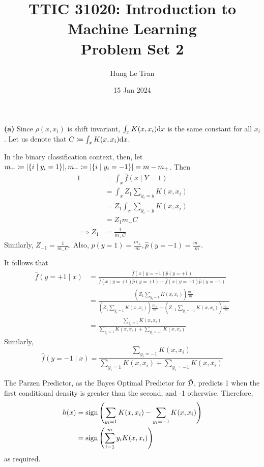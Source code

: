 \documentclass[a4paper, 12pt]{article}
\title{TTIC 31020: Introduction to Machine Learning \\ \large Problem Set 2}
\date{15 Jan 2024}
\author{Hung Le Tran}
\begin{document}
\maketitle
\setcounter{section}{2}
\begin{problem} [Problem 1]
\textbf{(a)} Since $\rho(x, x_i)$ is shift invariant, $\int_x K(x, x_i) \mathrm{d} x$ is the same constant for all $x_i$. Let us denote that $C \coloneqq \int_x K(x, x_i) \mathrm{d} x$.

In the binary classification context, then, let $m_+ \coloneqq \lvert\{i \mid y_i = 1\}\rvert, m_- \coloneqq  \lvert\{i \mid y_i = -1\}\rvert = m-m_+$. Then 
\begin{align*}
    1 &= \int_x \hat{f} (x \mid Y = 1) \\
    &= \int_x Z_{1} \sum_{y_i = y} {K(x, x_i)} \\
    &= Z_1 \int_x \sum_{y_i = y} {K(x, x_i)} \\
    &= Z_1 m_+ C \\
    \implies Z_1 &= \frac{1}{m_+ C}
\end{align*}
Similarly, $Z_{-1} = \frac{1}{m_-C}$.
Also, $\hat{p}(y = 1) = \frac{m_+}{m}, \hat{p} (y = -1) = \frac{m_-}{m}$.

It follows that \begin{align*}
    \hat{f}(y = +1 \mid x) &= \frac{\hat{f}(x \mid y = +1) \hat{p}(y = +1)}{\hat{f}(x \mid y = +1) \hat{p}(y = +1) + \hat{f}(x \mid y = -1) \hat{p}(y = -1)} \\
    &= \frac{\left(Z_1 \sum_{y_i = 1} K(x, x_i)\right) \frac{m_+}{m}}{\left(Z_1 \sum_{y_i = 1} K(x, x_i)\right) \frac{m_+}{m} + \left(Z_{-1}\sum_{y_i = -1} K(x, x_i)\right) \frac{m_-}{m}} \\
    &= \frac{\sum_{y_i = 1} K(x, x_i)}{\sum_{y_i = 1} K(x, x_i) + \sum_{y_i = -1} K(x, x_i)}
\end{align*}
Similarly, \begin{equation*}
\hat{f}(y = -1 \mid x) = \frac{\sum_{y_i = -1} K(x, x_i)}{\sum_{y_i = 1} K(x, x_i) + \sum_{y_i = -1} K(x, x_i)}
\end{equation*}

The Parzen Predictor, as the Bayes Optimal Predictor for $\hat{\mathcal{D}}$, predicts 1 when the first conditional density is greater than the second, and -1 otherwise. Therefore, 
\begin{align*}
    h(x) &= \mathrm{sign}\left(\sum_{y_i = 1} K(x, x_i) - \sum_{y_i = -1} K(x, x_i)\right) \\
    &= \mathrm{sign}\left(\sum_{i=1}^{m} y_i K(x, x_i)\right)
\end{align*}
as required.


\end{problem}
\end{document}
